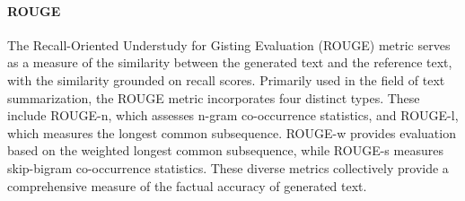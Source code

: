 

\paragraph{ROUGE}
The Recall-Oriented Understudy for Gisting Evaluation (ROUGE) metric \citep{lin2004rouge} serves as a measure of the similarity between the generated text and the reference text, with the similarity grounded on recall scores. Primarily used in the field of text summarization, the ROUGE metric incorporates four distinct types. These include ROUGE-n, which assesses n-gram co-occurrence statistics, and ROUGE-l, which measures the longest common subsequence. ROUGE-w provides evaluation based on the weighted longest common subsequence, while ROUGE-s measures skip-bigram co-occurrence statistics. These diverse metrics collectively provide a comprehensive measure of the factual accuracy of generated text.




